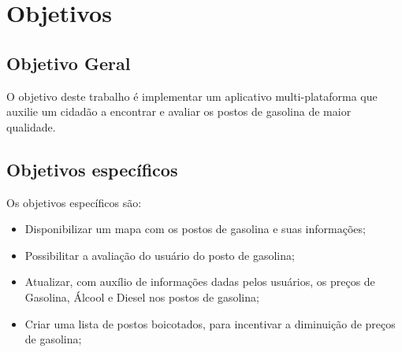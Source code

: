 \section{Objetivos}

\subsection{Objetivo Geral}

O objetivo deste trabalho é implementar um aplicativo multi-plataforma que auxilie um cidadão a encontrar e avaliar os postos de gasolina de maior qualidade.

\subsection{Objetivos específicos}

Os objetivos específicos são:
\begin{itemize}
    \item Disponibilizar um mapa com os postos de gasolina e suas informações;
    \item Possibilitar a avaliação do usuário do posto de gasolina;
    \item Atualizar, com auxílio de informações dadas pelos usuários, os preços de Gasolina, Álcool e Diesel nos postos de gasolina;
    \item Criar uma lista de postos boicotados, para incentivar a diminuição de preços de gasolina;
\end{itemize}
